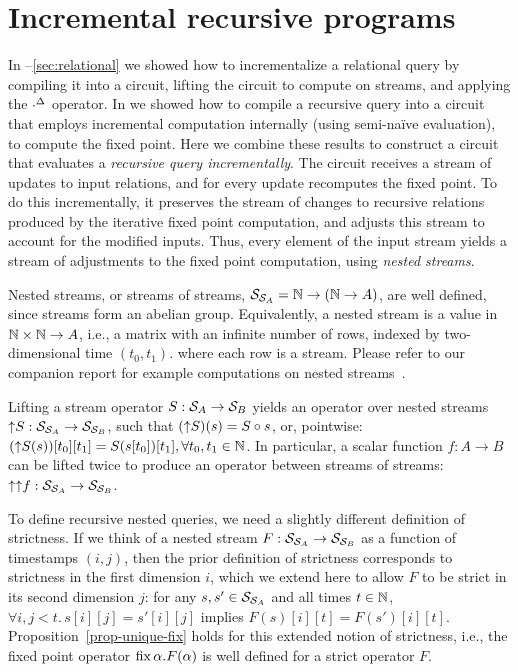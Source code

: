 \section{Incremental recursive programs}\label{sec:nested}

In --\ref{sec:relational}
we showed how to incrementalize a relational query by
compiling it into a circuit, lifting the circuit to compute on streams, and
applying the ${\cdot}^{\Delta}$ operator.  In  we showed
how to compile a recursive query into a circuit that employs incremental
computation internally (using semi-na\"ive evaluation), to compute the fixed point.
Here we combine these results to construct a circuit that evaluates a \emph{recursive
query incrementally}.  The circuit receives a stream of updates to input
relations, and for every update recomputes the fixed point.  To do this
incrementally, it preserves the stream of changes to recursive relations
produced by the iterative fixed point computation, and adjusts this stream to
account for the modified inputs.  Thus, every element of the input stream yields
a stream of adjustments to the fixed point computation, using
\emph{nested streams}.

Nested streams, or streams of streams, $\mathcal{S}_{\mathcal{S}_{A}} = \mathbb{N} \rightarrow (\mathbb{N}
\rightarrow A)$, are well defined, since streams form an abelian group.
Equivalently, a nested stream is a value in $\mathbb{N} \times \mathbb{N} \to A$, i.e., a matrix
with an infinite number of rows, indexed by two-dimensional time $(t_0, t_1)$.
where each row is a stream.  Please refer to our companion report for
example computations on nested streams~\cite{tr}.


Lifting a stream operator $S: \mathcal{S}_{A} \to \mathcal{S}_{B}$ yields an operator over
nested streams ${\uparrow}S: \mathcal{S}_{\mathcal{S}_{A}} \to \mathcal{S}_{\mathcal{S}_{B}}$, such
that $({\uparrow}S)(s) = S \circ s$, or, pointwise: $({\uparrow}S(s))[t_0][t_1] =
S(s[t_0])[t_1], \forall t_0, t_1 \in \mathbb{N}$.  In particular, a scalar function $f:
A \rightarrow B$ can be lifted twice to produce an operator between streams of
streams: ${\uparrow}{\uparrow}f: \mathcal{S}_{\mathcal{S}_{A}} \rightarrow \mathcal{S}_{\mathcal{S}_{B}}$.

To define recursive nested queries, we need a slightly different definition of strictness. If we think of a nested stream $F: \mathcal{S}_{\mathcal{S}_{A}} \to \mathcal{S}_{\mathcal{S}_{B}}$ as a function of timestamps $(i, j)$, then the prior definition of strictness corresponds to strictness in the first dimension $i$, which we extend here to allow $F$ to be strict in its second dimension $j$: for any $s, s' \in \mathcal{S}_{\mathcal{S}_{A}}$ and all times $t \in \mathbb{N}$, $\forall i, j < t.\, s[i][j] = s'[i][j]$ implies $F(s)[i][t] = F(s')[i][t]$.
Proposition~\ref{prop-unique-fix} holds for this extended notion of strictness, i.e., the fixed point operator $\mbox{fix}\,\alpha.F(\alpha)$ is well defined for a strict operator $F$.

